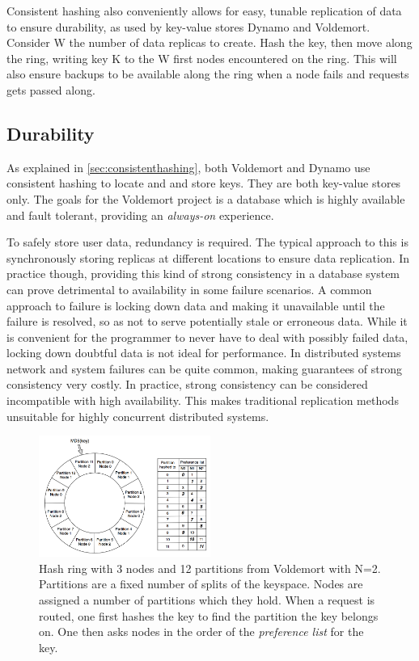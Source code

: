 Consistent hashing also conveniently allows for easy, tunable replication of data to ensure durability, as used by key-value stores Dynamo\cite{dynamo} and Voldemort\cite{voldemort}. Consider W the number of data replicas to create. Hash the key, then move along the ring, writing key K to the W first nodes encountered on the ring. This will also ensure backups to be available along the ring when a node fails and requests gets passed along.

\subsection{Durability}
As explained in \ref{sec:consistenthashing}, both Voldemort and Dynamo use consistent hashing to locate and and store keys.
They are both key-value stores only.
The goals for the Voldemort project is a database which is highly available and fault tolerant, providing an \emph{always-on} experience.

To safely store user data, redundancy is required. 
The typical approach to this is synchronously storing replicas at different locations to ensure data replication. 
In practice though, providing this kind of strong consistency in a database system can prove detrimental to availability in some failure scenarios.
A common approach to failure is locking down data and making it unavailable until the failure is resolved, so as not to serve potentially stale or erroneous data.
While it is convenient for the programmer to never have to deal with possibly failed data, locking down doubtful data is not ideal for performance.
In distributed systems network and system failures can be quite common, making guarantees of strong consistency very costly. In practice, strong consistency can be considered incompatible with high availability.
This makes traditional replication methods unsuitable for highly concurrent distributed systems.

\begin{figure}
    \includegraphics[width=0.5\textwidth]{background/figures/hashring_voldemort}
    \caption{Hash ring with 3 nodes and 12 partitions from Voldemort\cite{dynamo} with N=2. Partitions are a fixed number of splits of the keyspace. Nodes are assigned a number of partitions which they hold. When a request is routed, one first hashes the key to find the partition the key belongs on. One then asks nodes in the order of the \emph{preference list} for the key.}
    \label{fig:voldemort_hashring}
\end{figure}

